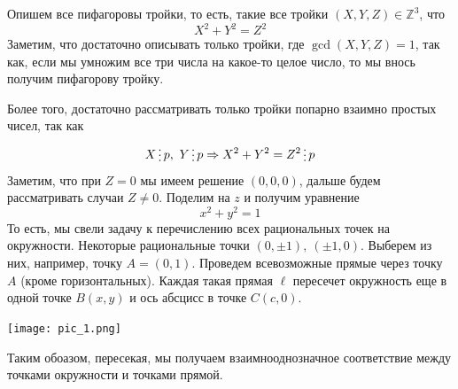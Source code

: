 \documentclass[11pt]{report}
\begin{document}
    \begin{example} Опишем все пифагоровы тройки, то есть, такие все тройки $(X, Y, Z) \in \mathbb{Z}^3$, что
        \[ X^2 + Y^2 = Z^2 \]
        Заметим, что достаточно описывать только тройки, где $\gcd(X, Y, Z) = 1$, так как, если мы умножим все три числа на какое-то
        целое число, то мы внось получим пифагорову тройку.

        Более того, достаточно рассматривать только тройки попарно взаимно простых чисел, так как
        \[ X \divisible p, \ Y \divisible p \Rightarrow X^2 + Y^2 = Z^2 \divisible p \]
        Заметим, что при $Z = 0$ мы имеем решение $(0, 0, 0)$, дальше будем рассматривать случаи $Z \neq 0$.
        Поделим на $z$ и получим уравнение
        \[ x^2 + y^2 = 1 \]
        То есть, мы свели задачу к перечислению всех рациональных точек на окружности.
        Некоторые рациональные точки $(0, \pm 1), \ (\pm 1, 0)$. Выберем из них, например, точку $A = (0, 1)$.
        Проведем всевозможные прямые через точку $A$ (кроме горизонтальных).
        Каждая такая прямая $\ell$ пересечет окружность еще в одной точке $B(x, y)$ и ось абсцисс в точке $C(c, 0)$.

        \begin{center}
            \texttt{[image: pic\_1.png]}
        \end{center}

        Таким обоазом, пересекая, мы получаем взаимнооднозначное соответствие между точками окружности и точками прямой.


\end{example}
\end{document}
